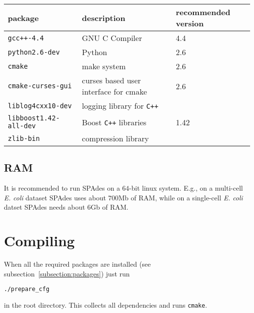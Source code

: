 \documentclass{article}
\def\spades{SPAdes}
\begin{document}
\begin{center}
\begin{tabular}{lll}
\toprule
package & description & recommended version\\
\midrule
{\tt gcc++-4.4} & GNU C Compiler & 4.4\\
{\tt python2.6-dev} & Python & 2.6\\
{\tt cmake} & make system & 2.6\\
{\tt cmake-curses-gui} & curses based user interface for cmake & 2.6\\
{\tt liblog4cxx10-dev} & logging library for {\tt C++} & \\
{\tt libboost1.42-all-dev} & Boost {\tt C++} libraries & 1.42\\
{\tt zlib-bin} & compression library & \\
\bottomrule
\end{tabular}
\end{center}

\subsection{RAM}
It is recommended to run {\spades} on a $64$-bit linux system. %
E.g., on a multi-cell {\it E. coli} dataset {\spades} uses about $700$Mb of RAM,
while on a single-cell {\it E. coli} datset {\spades} needs about $6$Gb of RAM.

\section{Compiling}
When all the required packages are installed (see 
subsection~\ref{subsection:packages})
just run
\begin{lstlisting}
./prepare_cfg
\end{lstlisting}
in the root directory. 
This collects all dependencies and runs {\tt cmake}.
\end{document}
